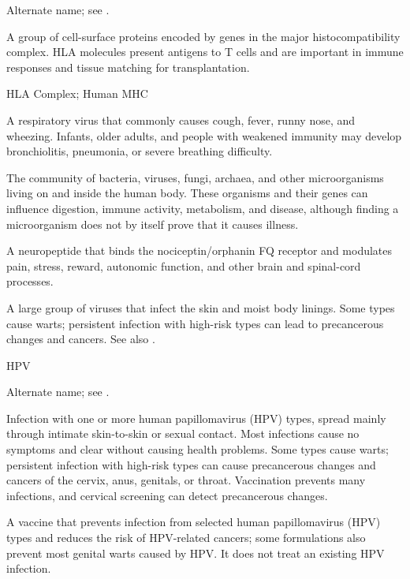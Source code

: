  Alternate name; see .

 A group of cell-surface proteins encoded by genes in the major histocompatibility complex. HLA molecules present antigens to T cells and are important in immune responses and tissue matching for transplantation.

\synonyms
HLA Complex; Human MHC

 A respiratory virus that commonly causes cough, fever, runny nose, and wheezing. Infants, older adults, and people with weakened immunity may develop bronchiolitis, pneumonia, or severe breathing difficulty.

 The community of bacteria, viruses, fungi, archaea, and other microorganisms living on and inside the human body. These organisms and their genes can influence digestion, immune activity, metabolism, and disease, although finding a microorganism does not by itself prove that it causes illness.

 A neuropeptide that binds the nociceptin/orphanin FQ receptor and modulates pain, stress, reward, autonomic function, and other brain and spinal-cord processes.

 A large group of viruses that infect the skin and moist body linings. Some types cause warts; persistent infection with high-risk types can lead to precancerous changes and cancers. See also .

\synonyms
HPV

 Alternate name; see .

 Infection with one or more human papillomavirus (HPV) types, spread mainly through intimate skin-to-skin or sexual contact. Most infections cause no symptoms and clear without causing health problems. Some types cause warts; persistent infection with high-risk types can cause precancerous changes and cancers of the cervix, anus, genitals, or throat. Vaccination prevents many infections, and cervical screening can detect precancerous changes.

 A vaccine that prevents infection from selected human papillomavirus (HPV) types and reduces the risk of HPV-related cancers; some formulations also prevent most genital warts caused by HPV. It does not treat an existing HPV infection.


